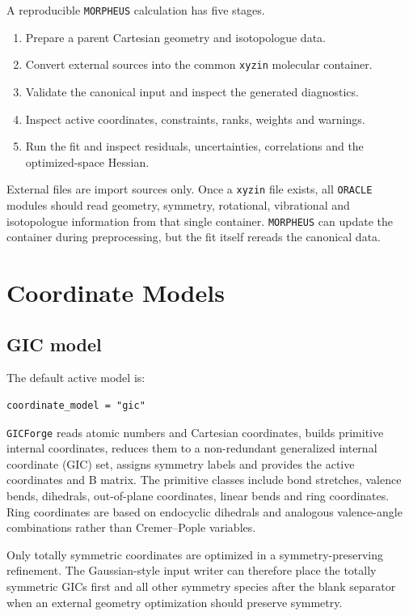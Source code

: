 \documentclass[11pt]{article}
\newcommand{\program}{\texttt{MORPHEUS}}
\newcommand{\oracle}{\texttt{ORACLE}}
\newcommand{\xyzin}{\texttt{xyzin}}
\newcommand{\gicforge}{\texttt{GICForge}}
\begin{document}
A reproducible \program{} calculation has five stages.

\begin{enumerate}
  \item Prepare a parent Cartesian geometry and isotopologue data.
  \item Convert external sources into the common \xyzin{} molecular container.
  \item Validate the canonical input and inspect the generated diagnostics.
  \item Inspect active coordinates, constraints, ranks, weights and warnings.
  \item Run the fit and inspect residuals, uncertainties, correlations and the
        optimized-space Hessian.
\end{enumerate}

External files are import sources only.  Once a \xyzin{} file exists, all
\oracle{} modules should read geometry, symmetry, rotational, vibrational and
isotopologue information from that single container.  \program{} can update the
container during preprocessing, but the fit itself rereads the canonical data.

\section{Coordinate Models}

\subsection{GIC model}

The default active model is:

\begin{lstlisting}[style=oracle]
coordinate_model = "gic"
\end{lstlisting}

\gicforge{} reads atomic numbers and Cartesian coordinates, builds primitive
internal coordinates, reduces them to a non-redundant generalized internal
coordinate (GIC) set, assigns symmetry labels and provides the active
coordinates and B matrix.  The primitive classes include bond stretches,
valence bends, dihedrals, out-of-plane coordinates, linear bends and ring
coordinates.  Ring coordinates are based on endocyclic dihedrals and analogous
valence-angle combinations rather than Cremer--Pople variables.

Only totally symmetric coordinates are optimized in a symmetry-preserving
refinement.  The Gaussian-style input writer can therefore place the totally
symmetric GICs first and all other symmetry species after the blank separator
when an external geometry optimization should preserve symmetry.
\end{document}
